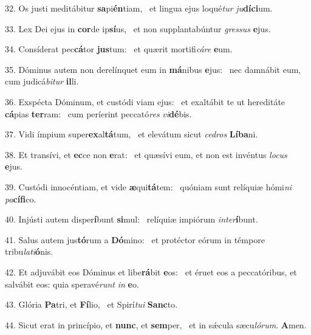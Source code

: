 32. Os justi meditábitur \textbf{sa}pi\textbf{én}tiam, \ast\  et lingua ejus loqué\textit{tur} \textit{ju}\textbf{dí}\textbf{ci}um.\

33. Lex Dei ejus in \textbf{cor}de ip\textbf{sí}us, \ast\  et non supplantabúntur \textit{gres}\textit{sus} \textbf{e}jus.\

34. Consíderat pec\textbf{cá}tor \textbf{jus}tum: \ast\  et quærit mortifi\textit{cá}\textit{re} \textbf{e}um.\

35. Dóminus autem non derelínquet eum in \textbf{má}nibus \textbf{e}jus: \ast\  nec damnábit eum, cum judicá\textit{bi}\textit{tur} \textbf{il}li.\

36. Exspécta Dóminum, et custódi viam ejus: \dag\  et exaltábit te ut hereditáte \textbf{cá}pias \textbf{ter}ram: \ast\  cum períerint peccató\textit{res} \textit{vi}\textbf{dé}bis.\

37. Vidi ímpium super\textbf{ex}al\textbf{tá}tum, \ast\  et elevátum sicut \textit{ce}\textit{dros} \textbf{Lí}\textbf{ba}ni.\

38. Et transívi, et \textbf{ec}ce non \textbf{e}rat: \ast\  et quæsívi eum, et non est invéntus \textit{lo}\textit{cus} \textbf{e}jus.\

39. Custódi innocéntiam, et vide \textbf{æ}qui\textbf{tá}tem: \ast\  quóniam sunt relíquiæ hómi\textit{ni} \textit{pa}\textbf{cí}\textbf{fi}co.\

40. Injústi autem disper\textbf{í}bunt \textbf{si}mul: \ast\  relíquiæ impiórum \textit{in}\textit{ter}\textbf{í}bunt.\

41. Salus autem jus\textbf{tó}rum a \textbf{Dó}mino: \ast\  et protéctor eórum in témpore tribu\textit{la}\textit{ti}\textbf{ó}nis.\

42. Et adjuvábit eos Dóminus et libe\textbf{rá}bit \textbf{e}os: \ast\  et éruet eos a peccatóribus, et salvábit eos: quia speravé\textit{runt} \textit{in} \textbf{e}o.\

43. Glória \textbf{Pa}tri, et \textbf{Fí}lio, \ast\  et Spirí\textit{tu}\textit{i} \textbf{Sanc}to.\

44. Sicut erat in princípio, et \textbf{nunc}, et \textbf{sem}per, \ast\  et in sǽcula sæcu\textit{ló}\textit{rum}. \textbf{A}men.\

